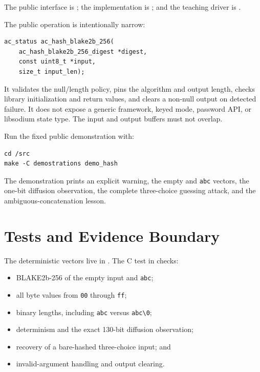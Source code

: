 The public interface is ; the implementation is
; and the teaching driver is
.

The public operation is intentionally narrow:

\begin{verbatim}
ac_status ac_hash_blake2b_256(
    ac_hash_blake2b_256_digest *digest,
    const uint8_t *input,
    size_t input_len);
\end{verbatim}

It validates the null/length policy, pins the algorithm and output length,
checks library initialization and return values, and clears a non-null output
on detected failure. It does not expose a generic framework, keyed mode,
password API, or libsodium state type. The input and output buffers must not
overlap.

Run the fixed public demonstration with:

\begin{verbatim}
cd /src
make -C demostrations demo_hash
\end{verbatim}

The demonstration prints an explicit warning, the empty and \texttt{abc}
vectors, the one-bit diffusion observation, the complete three-choice guessing
attack, and the ambiguous-concatenation lesson.

\section{Tests and Evidence Boundary}

The deterministic vectors live in
. The C test in
 checks:

\begin{itemize}
    \item BLAKE2b-256 of the empty input and \texttt{abc};
    \item all byte values from \texttt{00} through \texttt{ff};
    \item binary lengths, including \texttt{abc} versus \texttt{abc\textbackslash0};
    \item determinism and the exact 130-bit diffusion observation;
    \item recovery of a bare-hashed three-choice input; and
    \item invalid-argument handling and output clearing.
\end{itemize}

